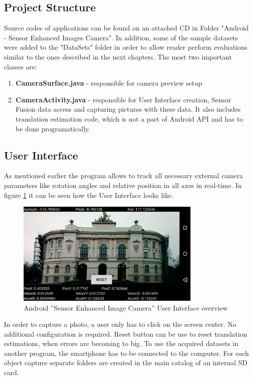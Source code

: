 \subsection{Project Structure}
Source codes of applications can be found on an attached CD in Folder "Android - Sensor Enhanced Images Camera". In addition, some of the sample datasets were added to the "DataSets" folder in order to allow reader perform evaluations similar to the ones described in the next chapters.
The most two important classes are:
\begin{enumerate}
\item \textbf{CameraSurface.java} - responsible for camera preview setup
\item \textbf{CameraActivity.java} - responsible for User Interface creation, Sensor Fusion data access and capturing pictures with these data. It also includes translation estimation code, which is not a part of Android API and has to be done programatically.
\end{enumerate}
\subsection{User Interface}
As mentioned earlier the program allows to track all necessary external camera parameters like rotation angles and relative position in all axes in real-time. In figure \ref{fig:AndroidScreenShot} it can be seen how the User Interface looks like.
\begin{figure}[h!]
    \centering
    \includegraphics[width=0.8\textwidth]{AndroidScreenShot}
    \caption{Android ''Sensor Enhanced Image Camera'' User Interface overview}
    \label{fig:AndroidScreenShot}
\end{figure}
In order to capture a photo, a user only has to click on the screen center. No additional configuration is required. Reset button can be use to reset translation estimations, when errors are becoming to big. To use the acquired datasets in another program, the smartphone has to be connected to the computer. For each object capture separate folders are created in the main catalog of an internal SD card.
